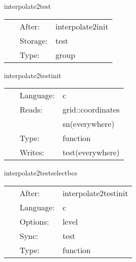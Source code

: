 \vspace{5mm}


\hspace{5mm} interpolate2test 

\hspace{5mm}{\it test interpolating inter-patch boundaries } 


\hspace{5mm}

 \begin{tabular*}{160mm}{cll} 
~ & After:  & interpolate2init \\ 
~ & Storage:  & test \\ 
~ & Type:  & group \\ 
\end{tabular*} 


\vspace{5mm}


\hspace{5mm} interpolate2testinit 

\hspace{5mm}{\it test: initialise test grid function } 


\hspace{5mm}

 \begin{tabular*}{160mm}{cll} 
~ & Language:  & c \\ 
~ & Reads:  & grid::coordinates \\ 
~& ~ &sn(everywhere)\\ 
~ & Type:  & function \\ 
~ & Writes:  & test(everywhere) \\ 
\end{tabular*} 


\vspace{5mm}


\hspace{5mm} interpolate2testselectbcs 

\hspace{5mm}{\it test: interpolate test grid function } 


\hspace{5mm}

 \begin{tabular*}{160mm}{cll} 
~ & After:  & interpolate2testinit \\ 
~ & Language:  & c \\ 
~ & Options:  & level \\ 
~ & Sync:  & test \\ 
~ & Type:  & function \\ 
\end{tabular*} 



